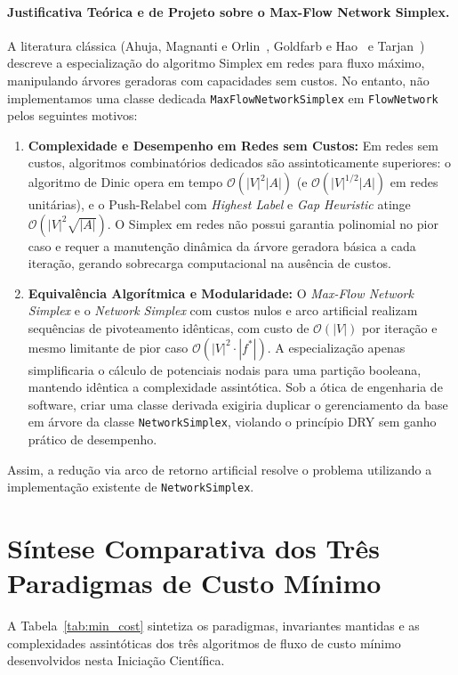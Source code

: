 \paragraph{Justificativa Teórica e de Projeto sobre o Max-Flow Network Simplex.}
A literatura clássica (Ahuja, Magnanti e Orlin~\cite{ahuja1993network}, Goldfarb e Hao~\cite{goldfarb1990primal} e Tarjan~\cite{tarjan1991efficiency}) descreve a especialização do algoritmo Simplex em redes para fluxo máximo, manipulando árvores geradoras com capacidades sem custos. No entanto, não implementamos uma classe dedicada \lstinline{MaxFlowNetworkSimplex} em \lstinline{FlowNetwork} pelos seguintes motivos:
\begin{enumerate}
    \item \textbf{Complexidade e Desempenho em Redes sem Custos:} Em redes sem custos, algoritmos combinatórios dedicados são assintoticamente superiores: o algoritmo de Dinic opera em tempo $\mathcal{O}(|V|^2 |A|)$ (e $\mathcal{O}(|V|^{1/2} |A|)$ em redes unitárias), e o Push-Relabel com \textit{Highest Label} e \textit{Gap Heuristic} atinge $\mathcal{O}(|V|^2 \sqrt{|A|})$. O Simplex em redes não possui garantia polinomial no pior caso e requer a manutenção dinâmica da árvore geradora básica a cada iteração, gerando sobrecarga computacional na ausência de custos.
    \item \textbf{Equivalência Algorítmica e Modularidade:} O \textit{Max-Flow Network Simplex} e o \textit{Network Simplex} com custos nulos e arco artificial realizam sequências de pivoteamento idênticas, com custo de $\mathcal{O}(|V|)$ por iteração e mesmo limitante de pior caso $\mathcal{O}(|V|^2 \cdot |f^*|)$. A especialização apenas simplificaria o cálculo de potenciais nodais para uma partição booleana, mantendo idêntica a complexidade assintótica. Sob a ótica de engenharia de software, criar uma classe derivada exigiria duplicar o gerenciamento da base em árvore da classe \lstinline{NetworkSimplex}, violando o princípio DRY sem ganho prático de desempenho.
\end{enumerate}
Assim, a redução via arco de retorno artificial resolve o problema utilizando a implementação existente de \lstinline{NetworkSimplex}.


\section{Síntese Comparativa dos Três Paradigmas de Custo Mínimo}

A Tabela~\ref{tab:min_cost} sintetiza os paradigmas, invariantes mantidas e as complexidades assintóticas dos três algoritmos de fluxo de custo mínimo desenvolvidos nesta Iniciação Científica.

